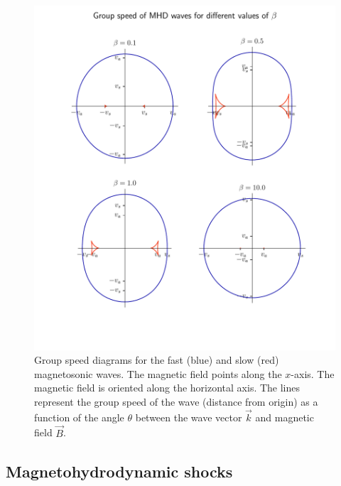 \begin{figure}[H]
	\centering
	\includegraphics[width=\linewidth]{images/MHD-group-speed.pdf}
	\caption{Group speed diagrams for the fast (blue) and slow (red) magnetosonic waves. The magnetic field points along the $x$-axis. The magnetic field is oriented along the horizontal axis. The lines represent the group speed of the wave (distance from origin) as a function of the angle $\theta$ between the wave vector $\vec{k}$ and magnetic field $\vec{B}$.}
	\label{fig:MHD-group-speed}
\end{figure}
\newpage

\subsection*{Magnetohydrodynamic shocks}


